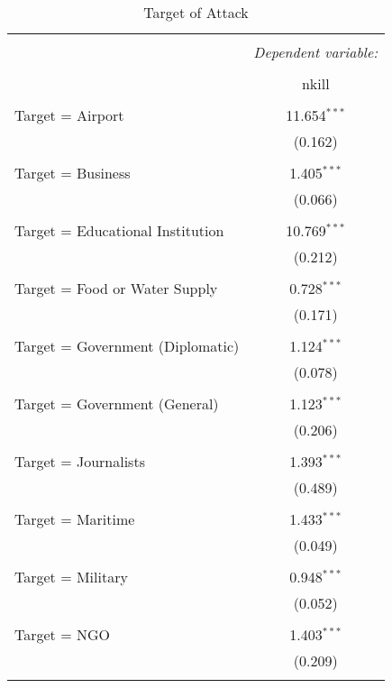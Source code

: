 
\begin{table}[!htbp] \centering 
  \caption{Target of Attack} 
  \label{} 
\begin{tabular}{@{\extracolsep{5pt}}lc} 
\\[-1.8ex]\hline 
\hline \\[-1.8ex] 
 & \multicolumn{1}{c}{\textit{Dependent variable:}} \\ 
\cline{2-2} 
\\[-1.8ex] & nkill \\ 
\hline \\[-1.8ex] 
 Target = Airport & 11.654$^{***}$ \\ 
  & (0.162) \\ 
  & \\ 
 Target = Business & 1.405$^{***}$ \\ 
  & (0.066) \\ 
  & \\ 
 Target = Educational Institution & 10.769$^{***}$ \\ 
  & (0.212) \\ 
  & \\ 
 Target = Food or Water Supply & 0.728$^{***}$ \\ 
  & (0.171) \\ 
  & \\ 
 Target = Government (Diplomatic) & 1.124$^{***}$ \\ 
  & (0.078) \\ 
  & \\ 
 Target = Government (General) & 1.123$^{***}$ \\ 
  & (0.206) \\ 
  & \\ 
 Target = Journalists & 1.393$^{***}$ \\ 
  & (0.489) \\ 
  & \\ 
 Target = Maritime & 1.433$^{***}$ \\ 
  & (0.049) \\ 
  & \\ 
 Target = Military & 0.948$^{***}$ \\ 
  & (0.052) \\ 
  & \\ 
 Target = NGO & 1.403$^{***}$ \\ 
  & (0.209) \\ 
  & \\ 

\end{tabular}
\end{table}
